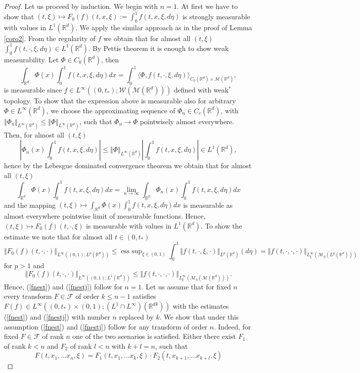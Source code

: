 \documentclass[10pt]{article}
\DeclareMathOperator*{\esssup}{ess~sup}
\newcommand*{\norm}[1]{\left\Vert{#1}\right\Vert}
\newcommand*{\abs}[1]{\left\vert{#1}\right\vert}
\newcommand{\R}{\mathbb{R}}
\newcommand{\izj}{\int_{0}^{1}}
\newcommand{\ird}{\int_{\mathbb{R}^d}}
\newcommand{\W}{\mathcal{W}}
\begin{document}
\begin{proof}
Let us proceed by induction. We begin with $n=1$. At first we have to show that 
$(t,\xi)\mapsto F_0(f)(t,x,\xi) := \izj f(t,x,\xi,d\eta)$ 
is strongly measurable with values in $L^{1}(\R^d)$. We apply the similar approach as in the proof of Lemma \ref{coro2}. From the regularity of $f$ we obtain that for almost all $(t,\xi)$ $\izj f(t,\cdot,\xi,d\eta) \in L^{1}(\R^d)$. By Pettis theorem it is enough to show weak measurability. Let $\Phi \in C_{0}(\R^d)$, then 
\[
\ird \Phi(x)\izj f(t,x,\xi,d\eta)dx = \izj \langle \Phi,  f(t,\cdot,\xi,d\eta)\rangle_{C_0(\R^d)\times  \mathcal{M}(\R^d)},
\]
is measurable since $f \in L^{\infty}((0,t_{*});\W(\mathcal{M}(\R^d)))$ defined with weak$^*$ topology. To show that the expression above is measurable also for arbitrary $\Phi \in L^{\infty}(\R^d)$, we choose the approximating sequence of $\Phi_n \in C_{c}(\R^d)$, with $\norm{\Phi_n}_{L^{\infty}(\R^d)} \leq \norm{\Phi}_{L^{\infty}(\R^d)}$, such that $\Phi_n \rightarrow \Phi$ pointwisely almost everywhere. Then, for almost all $(t,\xi)$ 
\[
\abs{\Phi_n(x)\izj f(t,x,\xi,d\eta)} \leq \norm{\Phi}_{L^{\infty}(\R^d)}\abs{\izj f(t,x,\xi,d\eta)} \in L^{1}(\R^d),
\]
 hence by the Lebesgue dominated convergence theorem we obtain that for almost all $(t,\xi)$
 \[
 \ird \Phi(x)\izj f(t,x,\xi,d\eta)dx =\lim_{n\rightarrow \infty} \ird \Phi_n(x)\izj f(t,x,\xi,d\eta)dx
 \]
 and the mapping $(t,\xi)\mapsto  \ird \Phi(x)\izj f(t,x,\xi,d\eta)dx$ is measurable as almost everywhere pointwise limit of measurable functions. Hence, $(t,\xi)\mapsto F_0(f)(t,\cdot,\xi)$ is measurable with values in $L^{1}(\R^d)$. To show the estimate we note that for almost all $t \in (0,t_{*})$
\[
\norm{F_0(f)(t,\cdot,\cdot)}_{L^{\infty}( (0,1);L^{p}(\R^{d}))} \leq \esssup_{\xi \in (0,1)}\izj \norm{f(t,\cdot,\xi,\cdot)}_{L^{p}(\R^d)}(d\eta) = \norm{f(t,\cdot,\cdot,\cdot)}_{L^{\infty}_\xi(\mathcal{M}_\eta(L^{p}(\R^d)))}
\]
for $p > 1$ and 
\[
\norm{F_0(f)(t,\cdot,\cdot)}_{L^{\infty}( (0,1);L^{1}(\R^{d}))} \leq  \norm{f(t,\cdot,\cdot,\cdot)}_{L^{\infty}_\xi(\mathcal{M}_\eta(\mathcal{M}(\R^d)))}.
\]
Hence,
 (\ref{fnest}) and (\ref{fnestj}) follow for $n=1$.
Let us assume that for fixed $n$ every transform $F\in \mathcal{F}$ of order $k \leq n-1$ satisfies $F(f) \in L^{\infty}((0,t_{*})\times (0,1);(L^{1}\cap L^{\infty})(\R^{dk}))$ with the estimates (\ref{fnest}) and (\ref{fnestj}) with number $n$ replaced by $k$.
We show that under this assumption (\ref{fnest}) and (\ref{fnestj}) follow for any transform  of order $n$. Indeed, for fixed $F \in \mathcal{F}$ of rank $n$ one of the two scenarios is satisfied. Either there exist $F_1$ of rank $k < n$ and $F_2$ of rank $l<n$ with  $k+l = n$, such that
\[
F(t,x_1,\dots x_n,\xi) = F_{1}(t,x_1,\dots x_k,\xi)\cdot F_{2}(t,x_{k+1},\dots x_{k+l},\xi)
\]


\end{proof}
\end{document}
